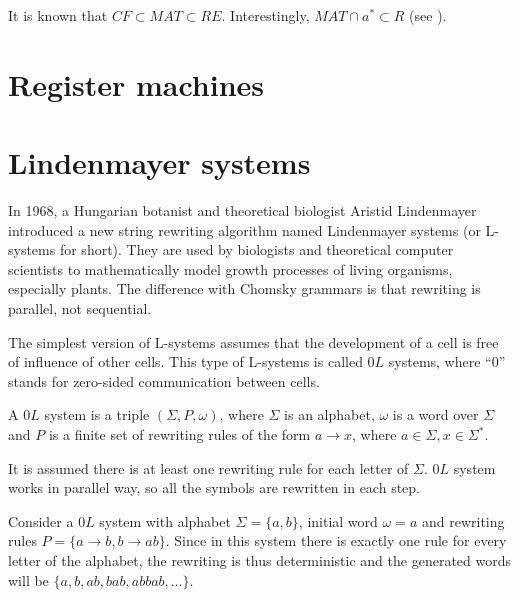 It is known that $CF \subset MAT \subset RE$. Interestingly, $MAT \cap {a}^* \subset R$ (see \cite{Besozzi:PhD:2004}).


\section{Register machines} %
\label{sec:register_machines}





\section{Lindenmayer systems} %
\label{sec:lindenmayer_systems}

In 1968, a Hungarian botanist and theoretical biologist Aristid Lindenmayer introduced \cite{Lindenmayer68} a new string rewriting algorithm named Lindenmayer systems (or L-systems for short). They are used by biologists and theoretical computer scientists to mathematically model growth processes of living organisms, especially plants. The difference with Chomsky grammars is that rewriting is parallel, not sequential.

The simplest version of L-systems assumes that the development of a cell is free of influence of other cells.
This type of L-systems is called $0L$ systems, where ``0'' stands for zero-sided communication between cells.

\begin{definition}
A $0L$ system is a triple $(\Sigma, P, \omega)$, where $\Sigma$ is an alphabet, $\omega$ is a word over $\Sigma$ and $P$ is a finite set of rewriting rules of the form $a\rightarrow x$, where $a\in\Sigma, x\in\Sigma^*$.
\end{definition}

It is assumed there is at least one rewriting rule for each letter of $\Sigma$. $0L$ system works in parallel way, so all the symbols are rewritten in each step.

\begin{example}
Consider a $0L$ system with alphabet $\Sigma = \{a,b\}$, initial word $\omega = a$ and rewriting rules $P = \{a\rightarrow b, b\rightarrow ab\}$.
Since in this system there is exactly one rule for every letter of the alphabet, the rewriting is thus deterministic and the generated words will be $\{a, b, ab, bab, abbab, \dots \}$. 
\end{example}

